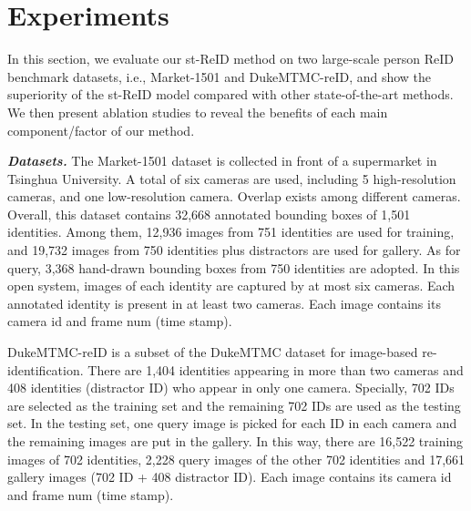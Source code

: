 \documentclass[letterpaper]{article} %
\begin{document}
\section{Experiments}
\label{sec:exp}
In this section, we evaluate our st-ReID method on two large-scale person ReID benchmark datasets, i.e., Market-1501 and DukeMTMC-reID, and show the superiority of the st-ReID model compared with other state-of-the-art methods. We then present ablation studies to reveal the benefits of each main component/factor of our method.

\textbf{\emph{Datasets.} }
The Market-1501 dataset is collected in front of a supermarket in Tsinghua University. A total of six cameras are used, including 5 high-resolution cameras, and one low-resolution camera. Overlap exists among different cameras. Overall, this dataset contains 32,668 annotated bounding boxes of 1,501 identities. Among them, 12,936 images from 751 identities are used for training, and 19,732 images from 750 identities plus distractors are used for gallery. As for query, 3,368 hand-drawn bounding boxes from 750 identities are adopted. In this open system, images of each identity are captured by at most six cameras. Each annotated identity is present in at least two cameras. Each image contains its camera id and frame num (time stamp).

DukeMTMC-reID is a subset of the DukeMTMC dataset for image-based re-identification. There are 1,404 identities appearing in more than two cameras and 408 identities (distractor ID) who appear in only one camera. Specially, 702 IDs are selected as the training set and the remaining 702 IDs are used as the testing set. In the testing set, one query image is picked for each ID in each camera and the remaining images are put in the gallery. In this way, there are 16,522 training images of 702 identities, 2,228 query images of the other 702 identities and 17,661 gallery images (702 ID + 408 distractor ID). Each image contains its camera id and frame num (time stamp).
\end{document}
